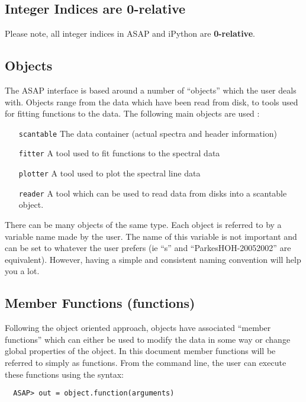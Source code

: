 \documentclass[11pt]{article}
\newcommand{\cmd}[1]{{\tt #1}}
\begin{document}
\subsection {Integer Indices are 0-relative}

Please note, all integer indices in ASAP and iPython are {\bf 0-relative}.

\subsection{Objects}

The ASAP interface is based around a number of ``objects'' which the
user deals with. Objects range from the data which have been read from
disk, to tools used for fitting functions to the data. The following
main objects are used :

\begin{itemize}
  \item[\cmd{scantable}] The data container (actual spectra and header
    information)
  \item[\cmd{fitter}] A tool used to fit functions to the spectral data
  \item[\cmd{plotter}] A tool used to plot the spectral line data
  \item[\cmd{reader}] A tool which can be used to read data from disks
    into a scantable object.
\end{itemize}

There can be many objects of the same type. Each object is referred to 
by a variable name made by the user. The name of this variable is not
important and can be set to whatever the user prefers (ie ``s'' and
``ParkesHOH-20052002'' are equivalent).  However, having a simple and
consistent naming convention will help you a lot.

\subsection{Member Functions (functions)}

Following the object oriented approach, objects have associated
``member functions'' which can either be used to modify the data in
some way or change global properties of the object. In this document
member functions will be referred to simply as functions. From the
command line, the user can execute these functions using the syntax:
\begin{verbatim}
  ASAP> out = object.function(arguments)
\end{verbatim}
\end{document}
